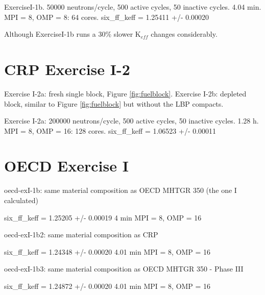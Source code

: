 \documentclass[11pt,letterpaper]{article}
\begin{document}


ExerciseI-1b. 
50000 neutrons/cycle, 500 active cycles, 50 inactive cycles.
4.04 min. MPI = 8, OMP = 8: 64 cores.
six_ff_keff = 1.25411 +/- 0.00020

Although ExerciseI-1b runs a 30\% slower K$_{eff}$ changes considerably.

\section{CRP Exercise I-2}

Exercise I-2a: fresh single block, Figure \ref{fig:fuelblock}.
Exercise I-2b: depleted block, similar to Figure \ref{fig:fuelblock} but without the LBP compacts.

Exercise I-2a:
200000 neutrons/cycle, 500 active cycles, 50 inactive cycles.
1.28 h. MPI = 8, OMP = 16: 128 cores.
six_ff_keff = 1.06523 +/- 0.00011

\section{OECD Exercise I}

oecd-exI-1b:
same material composition as OECD MHTGR 350 (the one I calculated)

six_ff_keff = 1.25205 +/- 0.00019
4 min MPI = 8, OMP = 16

oecd-exI-1b2:
same material composition as CRP

six_ff_keff = 1.24348 +/- 0.00020
4.01 min MPI = 8, OMP = 16

oecd-exI-1b3:
same material composition as OECD MHTGR 350 - Phase III

six_ff_keff = 1.24872 +/- 0.00020
4.01 min MPI = 8, OMP = 16

\pagebreak


\end{document}
